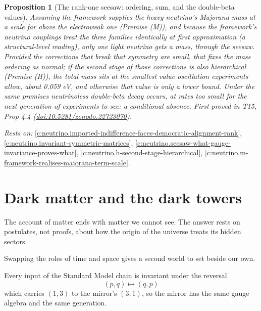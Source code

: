 \documentclass[11pt]{article}
\newtheorem{proposition}[theorem]{Proposition}
\theoremstyle{definition}
\theoremstyle{plain}
\begin{document}
\begin{proposition}[The rank-one seesaw: ordering, sum, and the double-beta values]\label{c:neutrino.rank-one-seesaw-ordering-sum-double}
Assuming the framework supplies the heavy neutrino's Majorana mass at a scale far above the electroweak one (Premise (M)), and because the framework's neutrino couplings treat the three families identically at first approximation (a structural-level reading), only one light neutrino gets a mass, through the seesaw. Provided the corrections that break that symmetry are small, that fixes the mass ordering as normal; if the second stage of those corrections is also hierarchical (Premise (H)), the total mass sits at the smallest value oscillation experiments allow, about 0.059 eV, and otherwise that value is only a lower bound. Under the same premises neutrinoless double-beta decay occurs, at rates too small for the next generation of experiments to see: a conditional absence.
\emph{First proved in} T15, Prop 4.4 (\href{https://doi.org/10.5281/zenodo.22723070}{doi:10.5281/zenodo.22723070}).
\end{proposition}
\noindent\emph{Rests on:} \ref{c:neutrino.imported-indifference-faces-democratic-alignment-rank}, \ref{c:neutrino.invariant-symmetric-matrices}, \ref{c:neutrino.seesaw-what-gauge-invariance-proves-what}, \ref{c:neutrino.h-second-stage-hierarchical}, \ref{c:neutrino.m-framework-realises-majorana-term-scale}.

\section{Dark matter and the dark towers}

The account of matter ends with matter we cannot see. The answer rests on postulates, not proofs, about how the origin of the universe treats its hidden sectors.

Swapping the roles of time and space gives a second world to set beside our own.

Every input of the Standard Model chain is invariant under the reversal \[ (p,q) \mapsto (q,p) \] which carries $(1,3)$ to the mirror's $(3,1)$, so the mirror has the same gauge algebra and the same generation.
\end{document}
